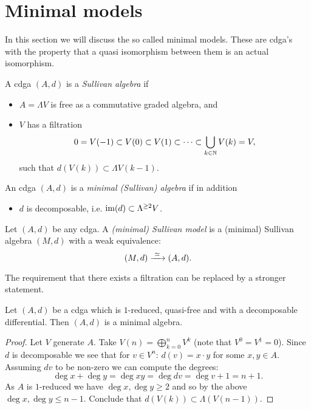
\chapter{Minimal models}
\label{sec:minimal-models}

In this section we will discuss the so called minimal models. These are cdga's with the property that a quasi isomorphism between them is an actual isomorphism.

\begin{definition}
	A cdga $(A, d)$ is a \emph{Sullivan algebra} if
	\begin{itemize}
		\item $A = \Lambda V$ is free as a commutative graded algebra, and
		\item $V$ has a filtration
		$$ 0 = V(-1) \subset V(0) \subset V(1) \subset \cdots \subset \bigcup_{k \in \mathbb{N}} V(k) = V, $$
		such that $d(V(k)) \subset \Lambda V(k-1)$.
	\end{itemize}

	An cdga $(A, d)$ is a \emph{minimal (Sullivan) algebra} if in addition
	\begin{itemize}
		\item $d$ is decomposable, i.e. $\operatorname*{im}(d) \subset \Lambda^{\geq 2}V$.
	\end{itemize}
\end{definition}

\begin{definition}
	Let $(A, d)$ be any cdga. A \emph{(minimal) Sullivan model} is a (minimal) Sullivan algebra $(M, d)$ with a weak equivalence:
	$$ (M, d) \xrightarrow{\,\,{\simeq}\,\,} (A, d). $$
\end{definition}

The requirement that there exists a filtration can be replaced by a stronger statement.

\begin{lemma}
	Let $(A, d)$ be a cdga which is $1$-reduced, quasi-free and with a decomposable differential. Then $(A, d)$ is a minimal algebra.
\end{lemma}
\begin{proof}
	Let $V$ generate $A$. Take $V(n) = \bigoplus_{k=0}^n V^k$ (note that $V^0 = V^1 = 0$). Since $d$ is decomposable we see that for $v \in V^n$: $d(v) = x \cdot y$ for some $x, y \in A$. Assuming $dv$ to be non-zero we can compute the degrees:
	$$ \deg{x} + \deg{y} = \deg{xy} = \deg{dv} = \deg{v} + 1 = n + 1. $$
	As $A$ is $1$-reduced we have $\deg{x}, \deg{y} \geq 2$ and so by the above $\deg{x}, \deg{y} \leq n-1$. Conclude that $d(V(k)) \subset \Lambda(V(n-1))$.
\end{proof}


